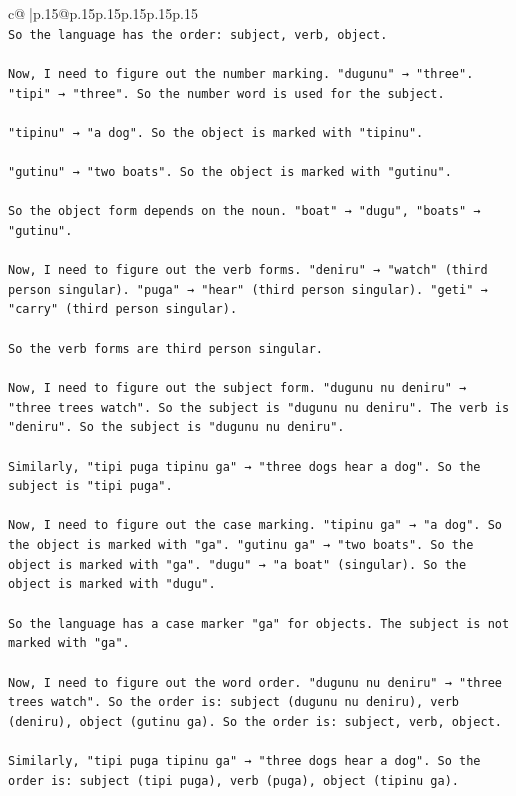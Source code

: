 \documentclass{article}
\begin{document}
{\begin{supertabular}{c@{$\;$}|p{.15\linewidth}@{}p{.15\linewidth}p{.15\linewidth}p{.15\linewidth}p{.15\linewidth}p{.15\linewidth}}
{{{\\ 
\texttt{So the language has the order: subject, verb, object.} \\
\\ 
\texttt{Now, I need to figure out the number marking. "dugunu" → "three". "tipi" → "three". So the number word is used for the subject.} \\
\\ 
\texttt{"tipinu" → "a dog". So the object is marked with "tipinu".} \\
\\ 
\texttt{"gutinu" → "two boats". So the object is marked with "gutinu".} \\
\\ 
\texttt{So the object form depends on the noun. "boat" → "dugu", "boats" → "gutinu".} \\
\\ 
\texttt{Now, I need to figure out the verb forms. "deniru" → "watch" (third person singular). "puga" → "hear" (third person singular). "geti" → "carry" (third person singular).} \\
\\ 
\texttt{So the verb forms are third person singular.} \\
\\ 
\texttt{Now, I need to figure out the subject form. "dugunu nu deniru" → "three trees watch". So the subject is "dugunu nu deniru". The verb is "deniru". So the subject is "dugunu nu deniru".} \\
\\ 
\texttt{Similarly, "tipi puga tipinu ga" → "three dogs hear a dog". So the subject is "tipi puga".} \\
\\ 
\texttt{Now, I need to figure out the case marking. "tipinu ga" → "a dog". So the object is marked with "ga". "gutinu ga" → "two boats". So the object is marked with "ga". "dugu" → "a boat" (singular). So the object is marked with "dugu".} \\
\\ 
\texttt{So the language has a case marker "ga" for objects. The subject is not marked with "ga".} \\
\\ 
\texttt{Now, I need to figure out the word order. "dugunu nu deniru" → "three trees watch". So the order is: subject (dugunu nu deniru), verb (deniru), object (gutinu ga). So the order is: subject, verb, object.} \\
\\ 
\texttt{Similarly, "tipi puga tipinu ga" → "three dogs hear a dog". So the order is: subject (tipi puga), verb (puga), object (tipinu ga).} \\
}}}
\end{supertabular}}
\end{document}
